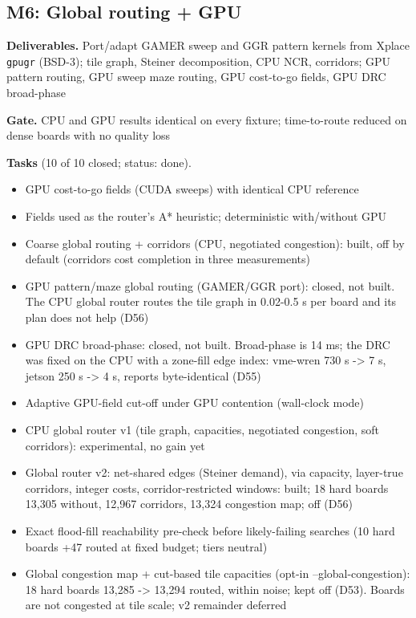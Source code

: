 \subsection*{M6: Global routing + GPU}
\noindent\textbf{Deliverables.} Port/adapt GAMER sweep and GGR pattern kernels from Xplace \texttt{gpugr} (BSD-3); tile graph, Steiner decomposition, CPU NCR, corridors; GPU pattern routing, GPU sweep maze routing, GPU cost-to-go fields, GPU DRC broad-phase\par\smallskip
\noindent\textbf{Gate.} CPU and GPU results identical on every fixture; time-to-route reduced on dense boards with no quality loss\par\smallskip
\noindent\textbf{Tasks} (10 of 10 closed; status: done).
\begin{itemize}[leftmargin=1.6em,itemsep=1pt]
\item[\textcolor{fraqua}{$\checkmark$}] GPU cost-to-go fields (CUDA sweeps) with identical CPU reference
\item[\textcolor{fraqua}{$\checkmark$}] Fields used as the router's A* heuristic; deterministic with/without GPU
\item[\textcolor{fraqua}{$\checkmark$}] Coarse global routing + corridors (CPU, negotiated congestion): built, off by default (corridors cost completion in three measurements)
\item[\textcolor{fraqua}{$\checkmark$}] GPU pattern/maze global routing (GAMER/GGR port): closed, not built. The CPU global router routes the tile graph in 0.02-0.5 s per board and its plan does not help (D56)
\item[\textcolor{fraqua}{$\checkmark$}] GPU DRC broad-phase: closed, not built. Broad-phase is 14 ms; the DRC was fixed on the CPU with a zone-fill edge index: vme-wren 730 s -\textgreater{} 7 s, jetson 250 s -\textgreater{} 4 s, reports byte-identical (D55)
\item[\textcolor{fraqua}{$\checkmark$}] Adaptive GPU-field cut-off under GPU contention (wall-clock mode)
\item[\textcolor{fraqua}{$\checkmark$}] CPU global router v1 (tile graph, capacities, negotiated congestion, soft corridors): experimental, no gain yet
\item[\textcolor{fraqua}{$\checkmark$}] Global router v2: net-shared edges (Steiner demand), via capacity, layer-true corridors, integer costs, corridor-restricted windows: built; 18 hard boards 13,305 without, 12,967 corridors, 13,324 congestion map; off (D56)
\item[\textcolor{fraqua}{$\checkmark$}] Exact flood-fill reachability pre-check before likely-failing searches (10 hard boards +47 routed at fixed budget; tiers neutral)
\item[\textcolor{fraqua}{$\checkmark$}] Global congestion map + cut-based tile capacities (opt-in --global-congestion): 18 hard boards 13,285 -\textgreater{} 13,294 routed, within noise; kept off (D53). Boards are not congested at tile scale; v2 remainder deferred
\end{itemize}
